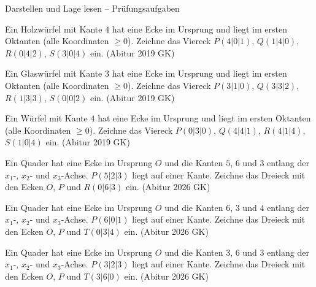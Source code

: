 \begin{aufgabe}{Darstellen und Lage lesen – Prüfungsaufgaben}
\begin{teile}
\teil Ein Holzwürfel mit Kante $4$ hat eine Ecke im Ursprung und liegt im ersten Oktanten (alle Koordinaten $\ge 0$). Zeichne das Viereck $P(4 | 0 | 1)$, $Q(1 | 4 | 0)$, $R(0 | 4 | 2)$, $S(3 | 0 | 4)$ ein. \hfill (Abitur 2019 GK)

\begin{ksys3}  \end{ksys3}
\teil Ein Glaswürfel mit Kante $3$ hat eine Ecke im Ursprung und liegt im ersten Oktanten (alle Koordinaten $\ge 0$). Zeichne das Viereck $P(3 | 1 | 0)$, $Q(3 | 3 | 2)$, $R(1 | 3 | 3)$, $S(0 | 0 | 2)$ ein. \hfill (Abitur 2019 GK)

\begin{ksys3}  \end{ksys3}
\teil Ein Würfel mit Kante $4$ hat eine Ecke im Ursprung und liegt im ersten Oktanten (alle Koordinaten $\ge 0$). Zeichne das Viereck $P(0 | 3 | 0)$, $Q(4 | 4 | 1)$, $R(4 | 1 | 4)$, $S(1 | 0 | 4)$ ein. \hfill (Abitur 2019 GK)

\begin{ksys3}  \end{ksys3}
\teil Ein Quader hat eine Ecke im Ursprung $O$ und die Kanten $5$, $6$ und $3$ entlang der $x_1$-, $x_2$- und $x_3$-Achse. $P(5 | 2 | 3)$ liegt auf einer Kante. Zeichne das Dreieck mit den Ecken $O$, $P$ und $R(0 | 6 | 3)$ ein. \hfill (Abitur 2026 GK)

\begin{ksys3}  \end{ksys3}
\teil Ein Quader hat eine Ecke im Ursprung $O$ und die Kanten $6$, $3$ und $4$ entlang der $x_1$-, $x_2$- und $x_3$-Achse. $P(6 | 0 | 1)$ liegt auf einer Kante. Zeichne das Dreieck mit den Ecken $O$, $P$ und $T(0 | 3 | 4)$ ein. \hfill (Abitur 2026 GK)

\begin{ksys3}  \end{ksys3}
\teil Ein Quader hat eine Ecke im Ursprung $O$ und die Kanten $3$, $6$ und $3$ entlang der $x_1$-, $x_2$- und $x_3$-Achse. $P(3 | 2 | 3)$ liegt auf einer Kante. Zeichne das Dreieck mit den Ecken $O$, $P$ und $T(3 | 6 | 0)$ ein. \hfill (Abitur 2026 GK)

\begin{ksys3}  \end{ksys3}
\end{teile}
\end{aufgabe}


